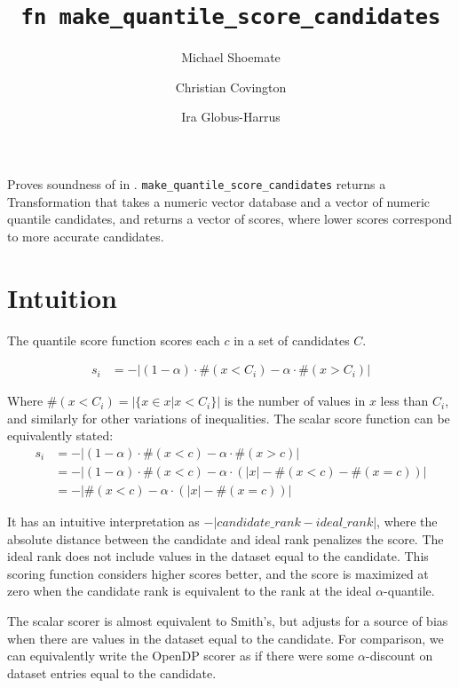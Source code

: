 \documentclass{article}
\title{\texttt{fn make\_quantile\_score\_candidates}}
\author{Michael Shoemate \and Christian Covington \and Ira Globus-Harrus}
\begin{document}
 
\maketitle   
 
Proves soundness of   
in . 
\texttt{make\_quantile\_score\_candidates} returns a Transformation that  
takes a numeric vector database and a vector of numeric quantile candidates, 
and returns a vector of scores, where lower scores correspond to more accurate candidates. 
 
\section{Intuition} 
The quantile score function scores each $c$ in a set of candidates $C$. 
 
\begin{equation} 
\begin{array}{rl} 
    s_i &= -|(1 - \alpha) \cdot \#(x < C_i) - \alpha \cdot \#(x > C_i)| 
\end{array} 
\end{equation} 
 
Where $\#(x < C_i) = |\{x \in x | x < C_i\}|$ is the number of values in $x$ less than $C_i$,  
and similarly for other variations of inequalities. 
The scalar score function can be equivalently stated: 
\begin{align} 
    s_i &= -|(1 - \alpha) \cdot \#(x < c) - \alpha \cdot \#(x > c)| \\ 
    &= -|(1 - \alpha) \cdot \#(x < c) - \alpha \cdot (|x| - \#(x < c) - \#(x = c))| \\ 
    &= -|\#(x < c) - \alpha \cdot (|x| - \#(x = c))| 
\end{align} 
 
It has an intuitive interpretation as $-|candidate\_rank - ideal\_rank|$,  
where the absolute distance between the candidate and ideal rank penalizes the score. 
The ideal rank does not include values in the dataset equal to the candidate. 
This scoring function considers higher scores better,  
and the score is maximized at zero when the candidate rank is equivalent to the rank at the ideal $\alpha$-quantile. 
 
The scalar scorer is almost equivalent to Smith's\cite{Smith11}, but adjusts for a source of bias when there are values in the dataset equal to the candidate. 
For comparison, we can equivalently write the OpenDP scorer as if there were some $\alpha$-discount on dataset entries equal to the candidate. 
 
\end{document}
